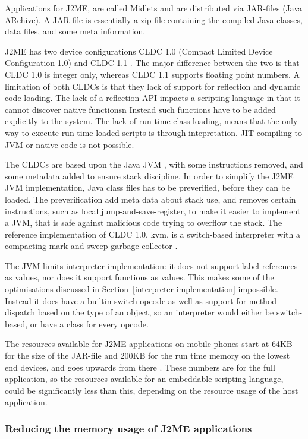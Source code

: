 \documentclass[11pt]{report}
\begin{document}
Applications for J2ME, are called Midlets and are distributed via JAR-files (Java ARchive). A JAR file is essentially a zip file containing the compiled Java classes, data files, and some meta information.

J2ME has two device configurations CLDC 1.0 (Compact Limited Device Configuration 1.0) \cite{cldc10}  and CLDC 1.1  \cite{cldc11}. The major difference between the two is that CLDC 1.0 is integer only, whereas CLDC 1.1 supports floating point numbers.
A limitation of both CLDCs is that they lack of support for reflection and dynamic code loading.
The lack of a reflection API impacts a scripting language in that it cannot discover native functionsn Instead such functions have to be added explicitly to the system.
The lack of run-time class loading, means that the only way to execute run-time loaded scripts is through intepretation. JIT compiling to JVM or native code is not possible.

The CLDCs are based upon the Java JVM \cite{jvmref}, with some instructions removed, and some metadata added to ensure stack discipline. 
In order to simplify the J2ME JVM implementation, Java class files has to be preverified, before they can be loaded.
The preverification add meta data about stack use, and removes certain instructions, such as local jump-and-save-register, to make it easier to implement a JVM, that is safe against malicious code trying to overflow the stack.
The reference implementation of CLDC 1.0, kvm, is a switch-based interpreter with a compacting mark-and-sweep garbage collector \cite{kvm}.


The JVM limits interpreter implementation: it does not support label references as values, nor does it support functions as values. This makes some of the optimisations discussed in 
Section~\ref{interpreter-implementation} impossible.
Instead it does have a builtin switch opcode as well as support for method-dispatch based on the type of an object, so an interpreter would either be switch-based, or have a class for every opcode.

The resources available for J2ME applications on mobile phones start at 64KB for the size of the JAR-file and 200KB for the run time memory on the lowest end devices, and goes upwards from there \cite{nokia-optim}.
These numbers are for the full application, so the resources available for an embeddable scripting language, could be significantly less than this, depending on the resource usage of the host application.

\subsubsection{Reducing the memory usage of J2ME applications}
\end{document}

